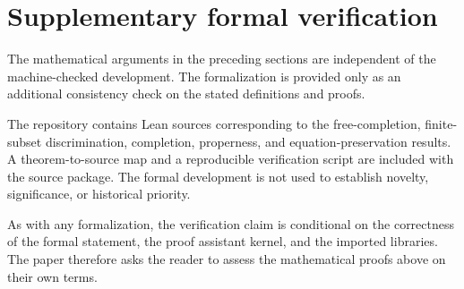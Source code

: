 \section{Supplementary formal verification}\label{app:formalization}

The mathematical arguments in the preceding sections are independent of the
machine-checked development.  The formalization is provided only as an
additional consistency check on the stated definitions and proofs.

The repository contains Lean sources corresponding to the free-completion,
finite-subset discrimination, completion, properness, and equation-preservation
results.  A theorem-to-source map and a reproducible verification script are
included with the source package.  The formal development is not used to
establish novelty, significance, or historical priority.

As with any formalization, the verification claim is conditional on the
correctness of the formal statement, the proof assistant kernel, and the
imported libraries.  The paper therefore asks the reader to assess the
mathematical proofs above on their own terms.
